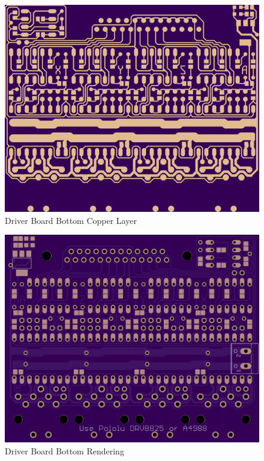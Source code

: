 \begin{figure}[h]
	\centering
	\includegraphics[width=1\textwidth]{pcb-design/dbottomroute.png}
	\caption{Driver Board Bottom Copper Layer}
	\label{fig:driver-bottom-copper}
\end{figure}
\begin{figure}[h]
	\centering
	\includegraphics[width=1\textwidth]{pcb-design/dbottomrender.png}
	\caption{Driver Board Bottom Rendering}
	\label{fig:driver-bottom-render}
\end{figure}